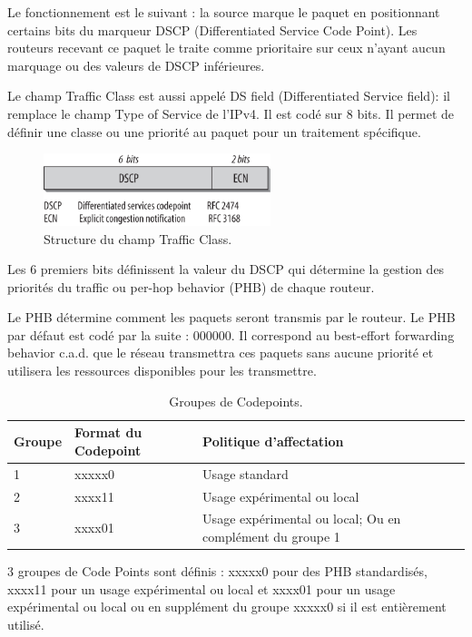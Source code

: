     Le fonctionnement est le suivant : la source marque le paquet en positionnant certains bits du marqueur DSCP (Differentiated Service Code Point).
    Les routeurs recevant ce paquet le traite comme prioritaire sur ceux n'ayant aucun marquage ou des valeurs de DSCP inférieures.
    
    Le champ Traffic Class est aussi appelé DS field (Differentiated Service field): il remplace le champ Type of Service de l'IPv4. Il est codé sur 8 bits. Il permet de définir une classe ou une priorité au paquet pour un traitement spécifique.
    
    \begin{figure}[h]
    \includegraphics[width=250px]{figures/trafficclass.png}
    \centering
    \caption{Structure du champ Traffic Class. \cite{Hagen2014}}
    \label{paquet_traffic_class}
    \end{figure}
	
    
    Les 6 premiers bits définissent la valeur du DSCP  qui détermine la gestion des priorités du traffic ou per-hop behavior (PHB) de chaque routeur. 
    
    Le PHB détermine comment les paquets seront transmis par le routeur.
    Le PHB par défaut est codé par la suite : 000000. Il correspond au best-effort forwarding behavior c.a.d. que le réseau transmettra ces paquets sans aucune priorité et utilisera les ressources disponibles pour les transmettre.
    
    \begin{table}[!h]
  \centering
  \begin{tabular}{|l|l|l|} 
   \hline
    Groupe & Format du Codepoint & Politique d'affectation\\
    \hline
    1 & xxxxx0 & Usage standard \\
    \hline
    2 & xxxx11 & Usage expérimental ou local\\
    \hline
    3 & xxxx01 & Usage expérimental ou local; Ou en complément du groupe 1\\
    \hline
  \end{tabular}
  \caption{Groupes de Codepoints.}
\end{table}

    3 groupes de Code Points sont définis : xxxxx0 pour des PHB standardisés, xxxx11 pour un usage expérimental ou local et xxxx01 pour un usage expérimental ou local ou en supplément du groupe xxxxx0 si il est entièrement utilisé.
    
